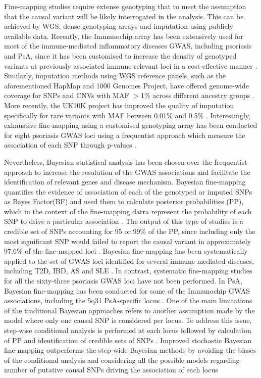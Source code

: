 Fine-mapping studies require extense genotyping that to meet the assumption that the causal variant will be likely interrogated in the analysis. This can be achieved by WGS, dense genotyping arrays and imputation using publicly available data. Recently, the Immunochip array has been extensively used for most of the immune-mediated inflammatory diseases GWAS, including psoriasis and PsA, since it has been customised to increase the density of genotyped variants at previously associated immune-relevant loci in a cost-effective manner \parencite{Trynka2011}. Similarly, imputation methods using WGS reference panels, such as the aforementioned HapMap and 1000 Genomes Project, have offered genome-wide coverage for SNPs and CNVs with MAF $>$1\% across different ancestry groups \parencite{Abecasis2012}. More recently, the UK10K project has improved the quality of imputation specifically for rare variants with MAF between 0.01\% and 0.5\% \parencite{Chou2016}. Interestingly, exhaustive fine-mapping using a customised genotyping array has been conducted for eight psoriasis GWAS loci using a frequentist approach which measure the association of each SNP through p-values \parencite{Das2014}. 

Nevertheless, Bayesian statistical analysis has been chosen over the frequentist approach to increase the resolution of the GWAS associations and facilitate the identification of relevant genes and disease mechanism. Bayesian fine-mapping quantifies the evidence of association of each of the genotyped or imputed SNPs as Bayes Factor(BF) and used them to calculate posterior probabilities (PP), which in the context of the fine-mapping datra represent the probability of each SNP to drive a particular association \parencite{Wakefield2007}. The output of this type of studies is a credible set of SNPs accounting for 95 or 99\% of the PP, since including only the most significant SNP would failed to report the causal variant in approximately 97.6\% of the fine-mapped loci \parencite{Bunt2015}. Bayesian fine-mapping has been systematically applied to the set of GWAS loci identified for several immune-mediated diseases, including T2D, IBD, AS and SLE \parencite{Maller2012,Gaulton2015,Bunt2015,Sun2016,Huang2017}. In contrast, systematic fine-mapping studies for all the sixty-three psoriasis GWAS loci have not been performed. In PsA, Bayesian fine-mapping has been conducted for some of the Immunochip GWAS associations, including the 5q31 PsA-specific locus  \parencite{Bowes2015}. One of the main limitations of the traditional Bayesian approaches refers to another assumption made by the model where only one causal SNP is considered per locus. To address this issue, step-wise conditional analysis is performed at each locus followed by calculation of PP and identification of credible sets of SNPs  . Improved stochastic Bayesian fine-mapping outperforms the step-wide Bayesian methods by avoiding the biases of the conditional analysis and considering all the possible models regarding number of putative causal SNPs driving the association of each locus \parencite{Wallace2016}

